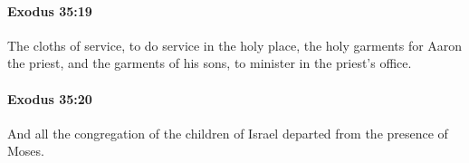 		\paragraph{Exodus 35:19} %
			\label{EXODUS-35-19}

			The cloths of service, to do service in the holy place, the holy garments for Aaron the priest, and the garments of his sons, to minister in the priest's office.


		\paragraph{Exodus 35:20} %
			\label{EXODUS-35-20}

			And all the congregation of the children of Israel departed from the presence of Moses.


